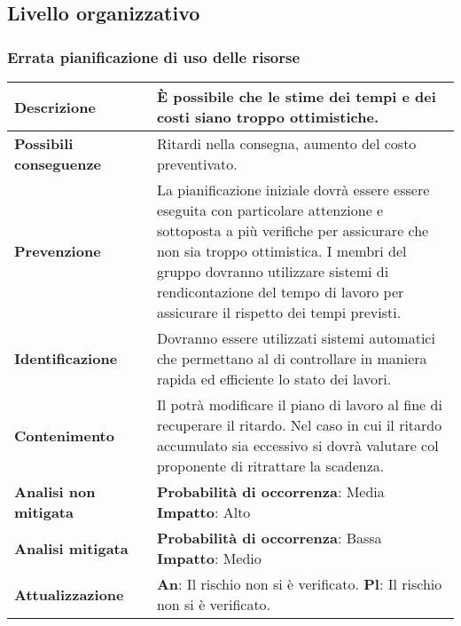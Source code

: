 				
	\newpage
	\subsection{Livello organizzativo}
		\subsubsection {Errata pianificazione di uso delle risorse}
			\label{subsec:errataPianificazione}
			
						\small
						\begin{table}[H]
						\begin{center}			
						\begin{tabular}{p{2.5cm}p{0.5cm}p{11cm}}
						\arrayrulecolor{lightgray}
						
						\toprule				
							\textbf{Descrizione}
							& &
							È possibile che le stime dei tempi e dei costi siano troppo ottimistiche.
						\\
						\midrule
							\textbf{Possibili \newline conseguenze}
							& &
							Ritardi nella consegna, aumento del costo preventivato.
						\\
						\midrule
							\textbf{Prevenzione}
							& &
							La pianificazione iniziale dovrà essere essere eseguita con particolare attenzione e sottoposta a più verifiche per assicurare che non sia troppo ottimistica. I membri del gruppo dovranno utilizzare sistemi di rendicontazione del tempo di lavoro per assicurare il rispetto dei tempi previsti.
						\\
						\midrule
							\textbf{Identificazione}
							& &
							 Dovranno essere utilizzati sistemi automatici che permettano al \responsabilediprogetto{} di controllare in maniera rapida ed efficiente lo stato dei lavori.
						\\
						\midrule
							\textbf{Contenimento}
							& &
							Il \responsabilediprogetto{} potrà modificare il piano di lavoro al fine di recuperare il ritardo. Nel caso in cui il ritardo accumulato sia eccessivo si dovrà valutare col proponente di ritrattare la scadenza.
						\\
						\midrule
							\textbf{Analisi \newline non mitigata}
							& &
							\textbf{Probabilità di occorrenza}: Media
							\newline
							\textbf{Impatto}: Alto
						\\
						\midrule
							\textbf{Analisi \newline mitigata}
							& &
							\textbf{Probabilità di occorrenza}: Bassa
							\newline
							\textbf{Impatto}: Medio
						\\
						\midrule
							\textbf{Attualizzazione}
							& &
							\textbf{An}:  Il rischio non si è verificato.
							\newline
							\textbf{Pl}: Il rischio non si è verificato.
						\\
						
						\bottomrule	
						\end{tabular}
						\end{center}
						\end{table}			
						
